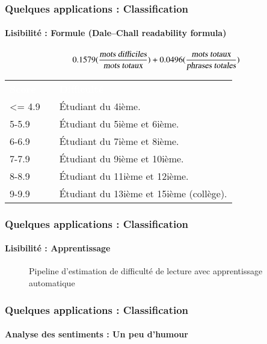 \documentclass[xcolor=table]{beamer}
\begin{document}
\begin{frame}
	\frametitle{Quelques applications : Classification}
	\framesubtitle{Lisibilité : Formule (Dale–Chall readability formula)}
	\[
	0.1579 (\frac{\text{\slshape mots difficiles}}{\text{\slshape mots totaux}})
	+ 0.0496 (\frac{\text{\slshape mots totaux}}{\text{\slshape phrases totales}})
	\]
	
	\begin{center}
		\footnotesize
		\begin{tabular}{p{}lp{}}
			\rowcolor{darkblue}
			\bfseries\textcolor{white}{Score} && \bfseries\textcolor{white}{Difficulté}\\
			\textless= 4.9 && Étudiant du 4ième. \\
			5-5.9 && Étudiant du 5ième et 6ième. \\
			6-6.9 && Étudiant du 7ième et 8ième.\\
			7-7.9 && Étudiant du 9ième et 10ième. \\
			8-8.9 && Étudiant du 11ième et 12ième. \\
			9-9.9 && Étudiant du 13ième et 15ième (collège). \\
		\end{tabular}
	\end{center}
	
\end{frame}

\begin{frame}
	\frametitle{Quelques applications : Classification}
	\framesubtitle{Lisibilité : Apprentissage}
	
	\begin{figure}
		\centering
		\caption{Pipeline d'estimation de difficulté de lecture avec apprentissage automatique \cite{2014-collins}}
	\end{figure}
	
\end{frame}

\begin{frame}
	\frametitle{Quelques applications : Classification}
	\framesubtitle{Analyse des sentiments : Un peu d'humour}
	
	\begin{center}
	\end{center}
	
\end{frame}

\end{document}
